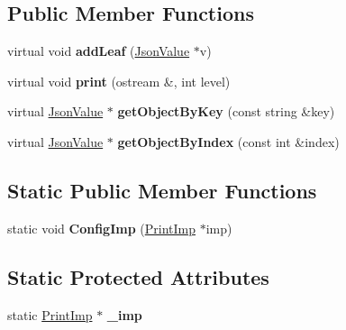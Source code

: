 \subsection*{Public Member Functions}
\begin{DoxyCompactItemize}
\item 
\hypertarget{class_json_value_a7a2553501c656b8dd5bd2803a0a70623}{virtual void {\bfseries add\-Leaf} (\hyperlink{class_json_value}{Json\-Value} $\ast$v)}\label{class_json_value_a7a2553501c656b8dd5bd2803a0a70623}

\item 
\hypertarget{class_json_value_a3f3d41930cd53a7f01cf8bfc7d5374f2}{virtual void {\bfseries print} (ostream \&, int level)}\label{class_json_value_a3f3d41930cd53a7f01cf8bfc7d5374f2}

\item 
\hypertarget{class_json_value_a2d7aa05f7ff5a0749bcd1806ab772b52}{virtual \hyperlink{class_json_value}{Json\-Value} $\ast$ {\bfseries get\-Object\-By\-Key} (const string \&key)}\label{class_json_value_a2d7aa05f7ff5a0749bcd1806ab772b52}

\item 
\hypertarget{class_json_value_a3ce0f88e789d84741805f45426b23263}{virtual \hyperlink{class_json_value}{Json\-Value} $\ast$ {\bfseries get\-Object\-By\-Index} (const int \&index)}\label{class_json_value_a3ce0f88e789d84741805f45426b23263}

\end{DoxyCompactItemize}
\subsection*{Static Public Member Functions}
\begin{DoxyCompactItemize}
\item 
\hypertarget{class_json_value_ad33b6639ae540eb58e4dddd6482e2c2d}{static void {\bfseries Config\-Imp} (\hyperlink{class_print_imp}{Print\-Imp} $\ast$imp)}\label{class_json_value_ad33b6639ae540eb58e4dddd6482e2c2d}

\end{DoxyCompactItemize}
\subsection*{Static Protected Attributes}
\begin{DoxyCompactItemize}
\item 
\hypertarget{class_json_value_adfbf245f1cc2660e840cd7a4d43296c8}{static \hyperlink{class_print_imp}{Print\-Imp} $\ast$ {\bfseries \-\_\-imp}}\label{class_json_value_adfbf245f1cc2660e840cd7a4d43296c8}

\end{DoxyCompactItemize}
